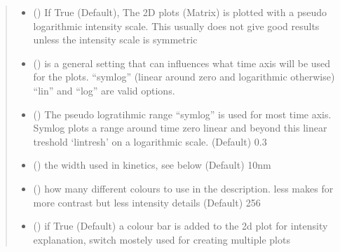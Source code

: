 \documentclass[letterpaper,10pt,english]{sphinxmanual}
\begin{document}
\begin{fulllineitems}
\begin{quote}
\begin{description}
\begin{itemize}
\item {} 
 (\sphinxstyleliteralemphasis{\sphinxupquote{, }}) \textendash{} If True (Default), The 2D plots (Matrix) is plotted with a pseudo logarithmic intensity scale.
This usually does not give good results unless the intensity scale is symmetric

\item {} 
 () \textendash{} is a general setting that can influences what time axis will be used for the plots.
“symlog” (linear around zero and logarithmic otherwise) “lin” and “log” are valid options.

\item {} 
 () \textendash{} The pseudo logratihmic range “symlog” is used for most time axis. Symlog plots a range around
time zero linear and beyond this linear treshold ‘lintresh’ on a logarithmic scale. (Default) 0.3

\item {} 
 (\sphinxstyleliteralemphasis{\sphinxupquote{, }}) \textendash{} the width used in kinetics, see below (Default) 10nm

\item {} 
 (\sphinxstyleliteralemphasis{\sphinxupquote{, }}) \textendash{} how many different colours to use in the description. less makes for more contrast but less
intensity details (Default) 256

\item {} 
 (\sphinxstyleliteralemphasis{\sphinxupquote{, }}) \textendash{} if True (Default) a colour bar is added to the 2d plot for intensity explanation, switch
mostely used for creating multiple plots


\end{itemize}
\end{description}
\end{quote}
\end{fulllineitems}
\end{document}
